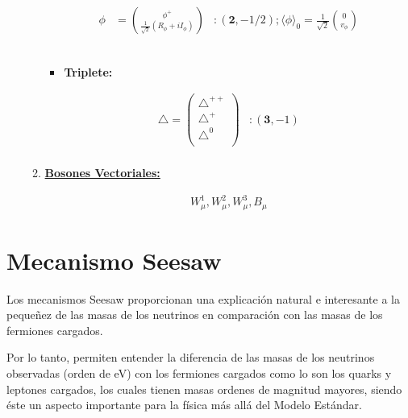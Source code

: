 \documentclass[12pt]{article}
\begin{document}
\begin{enumerate}
\begin{enumerate}
\begin{equation}
\begin{aligned}
      \phi & = \binom{\phi^{+}}{\frac{1}{\sqrt{2}}(R_\phi+iI_\phi )}& :  (\textbf{2}, -1/2);  \langle  \phi \rangle_0 = \frac{1}{\sqrt{2}}  \binom{0}{v_\phi} 
\end{aligned}
\end{equation} \\

\begin{itemize}
\item \textbf{Triplete:}
\end{itemize}

\begin{equation}
\begin{aligned}
 \triangle= \begin{pmatrix} \triangle^{++}   \\ \triangle^{+}  \\  \triangle^{0} \\ \end{pmatrix} & :  (\textbf{3}, -1) \\ 
\end{aligned}
\end{equation}


\item\underline{ \textbf{Bosones Vectoriales:}}


\begin{equation}
\begin{aligned}
 W_\mu^{1}, W_\mu^{2}, W_\mu^{3}, B_\mu 
\end{aligned}
\end{equation}
\end{enumerate}
\end{enumerate}


\section{Mecanismo Seesaw}

Los mecanismos Seesaw proporcionan una explicación natural e interesante a la pequeñez de las masas de los neutrinos en comparación
con las masas de los fermiones cargados. 


Por lo tanto, permiten entender la diferencia de las masas de los neutrinos observadas (orden de eV) con los fermiones cargados como lo son los quarks y leptones cargados, los cuales tienen masas ordenes de magnitud mayores, siendo éste un aspecto importante para la física más allá del Modelo Estándar.   
\end{document}
